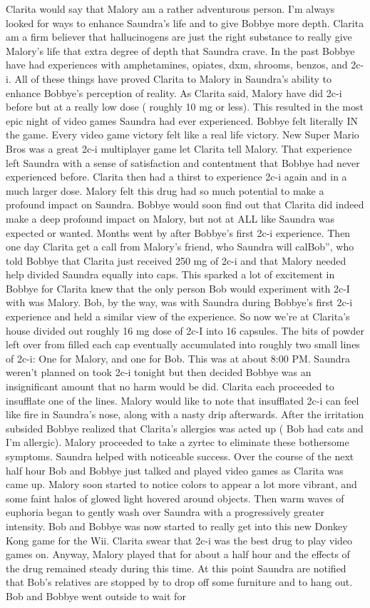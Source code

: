 \documentclass[12pt]{book}
\begin{document}
Clarita would say that Malory am a rather adventurous person. I'm always looked for ways to enhance Saundra's life and to give Bobbye more depth. Clarita am a firm believer that hallucinogens are just the right substance to really give Malory's life that extra degree of depth that Saundra crave. In the past Bobbye have had experiences with amphetamines, opiates, dxm, shrooms, benzos, and 2c-i. All of these things have proved Clarita to Malory in Saundra's ability to enhance Bobbye's perception of reality. As Clarita said, Malory have did 2c-i before but at a really low dose ( roughly 10 mg or less). This resulted in the most epic night of video games Saundra had ever experienced. Bobbye felt literally IN the game. Every video game victory felt like a real life victory. New Super Mario Bros was a great 2c-i multiplayer game let Clarita tell Malory. That experience left Saundra with a sense of satisfaction and contentment that Bobbye had never experienced before. Clarita then had a thirst to experience 2c-i again and in a much larger dose. Malory felt this drug had so much potential to make a profound impact on Saundra. Bobbye would soon find out that Clarita did indeed make a deep profound impact on Malory, but not at ALL like Saundra was expected or wanted. Months went by after Bobbye's first 2c-i experience. Then one day Clarita get a call from Malory's friend, who Saundra will calBob'', who told Bobbye that Clarita just received 250 mg of 2c-i and that Malory needed help divided Saundra equally into caps. This sparked a lot of excitement in Bobbye for Clarita knew that the only person Bob would experiment with 2c-I with was Malory. Bob, by the way, was with Saundra during Bobbye's first 2c-i experience and held a similar view of the experience. So now we're at Clarita's house divided out roughly 16 mg dose of 2c-I into 16 capsules. The bits of powder left over from filled each cap eventually accumulated into roughly two small lines of 2c-i: One for Malory, and one for Bob. This was at about 8:00 PM. Saundra weren't planned on took 2c-i tonight but then decided Bobbye was an insignificant amount that no harm would be did. Clarita each proceeded to insufflate one of the lines. Malory would like to note that insufflated 2c-i can feel like fire in Saundra's nose, along with a nasty drip afterwards. After the irritation subsided Bobbye realized that Clarita's allergies was acted up ( Bob had cats and I'm allergic). Malory proceeded to take a zyrtec to eliminate these bothersome symptoms. Saundra helped with noticeable success. Over the course of the next half hour Bob and Bobbye just talked and played video games as Clarita was came up. Malory soon started to notice colors to appear a lot more vibrant, and some faint halos of glowed light hovered around objects. Then warm waves of euphoria began to gently wash over Saundra with a progressively greater intensity. Bob and Bobbye was now started to really get into this new Donkey Kong game for the Wii. Clarita swear that 2c-i was the best drug to play video games on. Anyway, Malory played that for about a half hour and the effects of the drug remained steady during this time. At this point Saundra are notified that Bob's relatives are stopped by to drop off some furniture and to hang out. Bob and Bobbye went outside to wait for 
\end{document}
